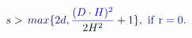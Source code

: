 \documentclass[12pt]{article}
\begin{document}
\makeatletter
\renewcommand*{\@textcolor}[3]{%
  \protect\leavevmode
  \begingroup
    \color#1{#2}#3%
  \endgroup
}
\makeatother
\begin{displaymath}
\mathcolor[RGB]{0,0,15}{s} \mathcolor[RGB]{0,0,30}{>} \mathcolor[RGB]{0,0,45}{\operatorname*} { \mathcolor[RGB]{0,0,60}{m} \mathcolor[RGB]{0,0,75}{a} \mathcolor[RGB]{0,0,90}{x} } \mathcolor[RGB]{0,0,105}{\{} \mathcolor[RGB]{0,0,120}{2} \mathcolor[RGB]{0,0,135}{d} \mathcolor[RGB]{0,0,150}{,} \mathcolor[RGB]{0,0,165}{\frac { \mathcolor[RGB]{0,0,180}{(} \mathcolor[RGB]{0,0,195}{D} \mathcolor[RGB]{0,0,210}{\cdot} \mathcolor[RGB]{0,0,225}{H} \mathcolor[RGB]{0,0,240}{)} ^ { \mathcolor[RGB]{0,0,255}{2} } } { \mathcolor[RGB]{0,15,0}{2} \mathcolor[RGB]{0,15,15}{H} ^ { \mathcolor[RGB]{0,15,30}{2} } } } \mathcolor[RGB]{0,15,45}{+} \mathcolor[RGB]{0,15,60}{1} \mathcolor[RGB]{0,15,75}{\}} \mathcolor[RGB]{0,15,90}{,} \mathrm { ~ \mathcolor[RGB]{0,15,105}{i} \mathcolor[RGB]{0,15,120}{f} ~ \mathcolor[RGB]{0,15,135}{r} \mathcolor[RGB]{0,15,150}{=} \mathcolor[RGB]{0,15,165}{0} } \mathcolor[RGB]{0,15,180}{.}
\end{displaymath}
\end{document}
